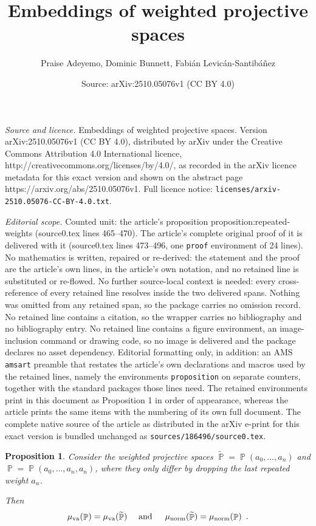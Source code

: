 \documentclass[10pt,a4paper]{amsart}
\title{Embeddings of weighted projective spaces}
\author{Praise Adeyemo, Dominic Bunnett, Fabi\'an Levic\'an-Santib\'a\~nez}
\date{Source: arXiv:2510.05076v1 (CC BY 4.0)}
\newtheorem{proposition}{Proposition}
\DeclareMathOperator{\PP}{\mathbb{P}}
\DeclareMathOperator{\munorm}{\mu_{\text norm}}
\DeclareMathOperator{\muva}{\mu_{\text va}}
\begin{document}
\maketitle

\noindent\emph{Source and licence.} Embeddings of weighted projective spaces. Version arXiv:2510.05076v1 (CC BY 4.0), distributed by arXiv under the Creative Commons Attribution 4.0 International licence, http://creativecommons.org/licenses/by/4.0/, as recorded in the arXiv licence metadata for this exact version and shown on the abstract page https://arxiv.org/abs/2510.05076v1. Full licence notice: \texttt{licenses/arxiv-2510.05076-CC-BY-4.0.txt}.\par\smallskip

\noindent\textit{Editorial scope.} Counted unit: the article's proposition proposition:repeated-weights (source0.tex lines 465--470). The article's complete original proof of it is delivered with it (source0.tex lines 473--496, one \texttt{proof} environment of 24 lines). No mathematics is written, repaired or re-derived: the statement and the proof are the article's own lines, in the article's own notation, and no retained line is substituted or re-flowed.  No further source-local context is needed: every cross-reference of every retained line resolves inside the two delivered spans.  Nothing was omitted from any retained span, so the package carries no omission record.  No retained line contains a citation, so the wrapper carries no bibliography and no bibliography entry.  No retained line contains a figure environment, an image-inclusion command or drawing code, so no image is delivered and the package declares no asset dependency.  Editorial formatting only, in addition: an AMS \texttt{amsart} preamble that restates the article's own declarations and macros used by the retained lines, namely the environments \texttt{proposition} on separate counters, together with the standard packages those lines need.  The retained environments print in this document as Proposition 1 in order of appearance, whereas the article prints the same items with the numbering of its own full document.  The complete native source of the article as distributed in the arXiv e-print for this exact version is bundled unchanged as \texttt{sources/186496/source0.tex}.
\begin{proposition}\label{proposition:repeated-weights}
    Consider the weighted projective spaces $\widetilde{\PP} = \PP(a_0, \dots , a_n)$ and $\PP = \PP(a_0, \dots , a_n , a_n)$, where they only differ by dropping the last repeated weight $a_n$.

    Then 
    \[\muva(\PP) = \muva(\widetilde{\PP}) \quad\text{ and }\quad \munorm(\widetilde{\PP}) = \munorm(\PP) \enspace.\]
\end{proposition}
\end{document}
